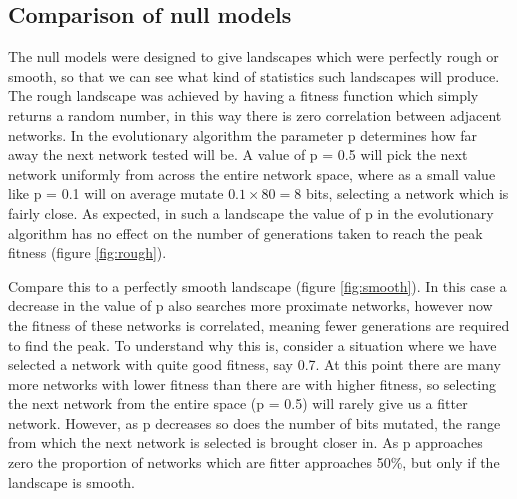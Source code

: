 \documentclass[a4paper,11pt]{article}
\begin{document}
\subsection{Comparison of null models}
The null models were designed to give landscapes which were perfectly rough or smooth, so that we can see what kind of statistics such landscapes will produce. The rough landscape was achieved by having a fitness function which simply returns a random number, in this way there is zero correlation between adjacent networks. In the evolutionary algorithm the parameter p determines how far away the next network tested will be. A value of p = 0.5 will pick the next network uniformly from across the entire network space, where as a small value like p = 0.1 will on average mutate $0.1\times80=8$ bits, selecting a network which is fairly close. As expected, in such a landscape the value of p in the evolutionary algorithm has no effect on the number of generations taken to reach the peak fitness (figure \ref{fig:rough}).\par

Compare this to a perfectly smooth landscape (figure \ref{fig:smooth}). In this case a decrease in the value of p also searches more proximate networks, however now the fitness of these networks is correlated, meaning fewer generations are required to find the peak. To understand why this is, consider a situation where we have selected a network with quite good fitness, say 0.7. At this point there are many more networks with lower fitness than there are with higher fitness, so selecting the next network from the entire space (p = 0.5) will rarely give us a fitter network. However, as p decreases so does the number of bits mutated, the range from which the next network is selected is brought closer in. As p approaches zero the proportion of networks which are fitter approaches 50\%, but only if the landscape is smooth.\par
\end{document}
